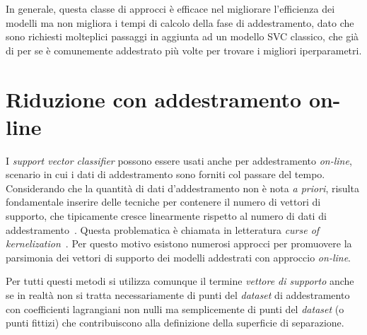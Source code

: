 In generale, questa classe di approcci è efficace nel migliorare l'efficienza dei modelli ma non migliora i tempi di calcolo della fase di addestramento, dato che sono richiesti molteplici passaggi in aggiunta ad un modello SVC classico, che già di per se è comunemente addestrato più volte per trovare i migliori iperparametri.

\section{Riduzione con addestramento on-line}\label{sec:sparsesvm:on-line}
I \emph{support vector classifier} possono essere usati anche per addestramento \emph{on-line}, scenario in cui i dati di addestramento sono forniti col passare del tempo. 
Considerando che la quantità di dati d'addestramento non è nota \emph{a priori}, risulta fondamentale inserire delle tecniche per contenere il numero di vettori di supporto, che tipicamente cresce linearmente rispetto al numero di dati di addestramento~\cite{2003_online_classification_on_a_budget}. 
Questa problematica è chiamata in letteratura \emph{curse of kernelization}~\cite{2012_bsgd}. 
Per questo motivo esistono numerosi approcci per promuovere la parsimonia dei vettori di supporto dei modelli addestrati con approccio \emph{on-line}.

Per tutti questi metodi si utilizza comunque il termine \emph{vettore di supporto} anche se in realtà non si tratta necessariamente di punti del \emph{\emph{dataset}} di addestramento con coefficienti lagrangiani non nulli ma semplicemente di punti del \emph{\emph{dataset}} (o punti fittizi) che contribuiscono alla definizione della superficie di separazione.

